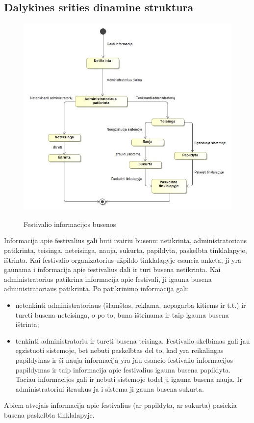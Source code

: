 ﻿\documentclass{VUMIFPSkursinis}
\begin{document}
\subsection{Dalykines srities dinamine struktura}
\begin{figure}[H]
    \centering
    \includegraphics[scale=0.7]{img/geri/Informacija_Busenos.jpg}
    \label{img:uml18}
	\caption{Festivalio informacijos busenos}
\end{figure}
Informacija apie festivalius gali buti ivairiu busenu: netikrinta, administratoriaus patikrinta, teisinga, neteisinga, nauja, sukurta, papildyta, paskelbta tinklalapyje, ištrinta. Kai festivalio organizatorius užpildo tinklalapyje esancia anketa, ji yra gaunama i informacija apie festivalius dali ir turi busena netikrinta. Kai administratorius patikrina informacija apie festivali, ji igauna busena administratoriaus patikrinta. Po patikrinimo informacija gali:
\begin{itemize}
\item netenkinti administratoriaus (šlamštas, reklama, nepagarba kitiems ir t.t.) ir tureti busena neteisinga, o po to, buna ištrinama ir taip igauna busena ištrinta;
\item tenkinti administratoriu ir tureti busena teisinga. Festivalio skelbimas gali jau egzistuoti sistemoje, bet nebuti paskelbtas del to, kad yra reikalingas papildymas ir ši nauja informacija yra jau esancio festivalio informacijos papildymas ir taip informacija apie festivalius igauna busena papildyta. Taciau informacijos gali ir nebuti sistemoje todel ji igauna busena nauja. Ir administratoriui itraukus ja i sistema ji gauna busena sukurta. 
\end{itemize}
Abiem atvejais informacija apie festivalius (ar papildyta, ar sukurta) pasiekia busena paskelbta tinklalapyje.
\end{document}

